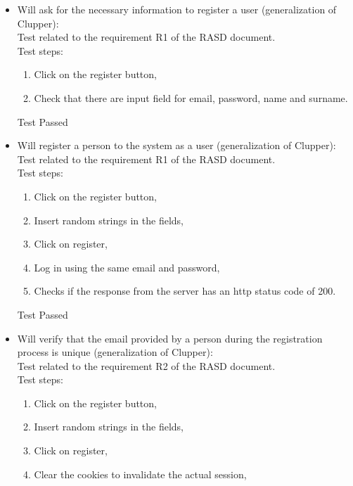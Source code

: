 \begin{itemize}
    \item Will ask for the necessary information to register a user (generalization of Clupper): \\
    Test related to the requirement R1 of the RASD document. \\
    Test steps:
    \begin{enumerate}
        \item Click on the register button,
        \item Check that there are input field for email, password, name and surname.
    \end{enumerate}
    Test Passed \\

    \item Will register a person to the system as a user (generalization of Clupper): \\
    Test related to the requirement R1 of the RASD document. \\
    Test steps:
    \begin{enumerate}
        \item Click on the register button,
        \item Insert random strings in the fields,
        \item Click on register,
        \item Log in using the same email and password,
        \item Checks if the response from the server has an http status code of 200.
    \end{enumerate}
    Test Passed \\

    \item Will verify that the email provided by a person during the registration process is unique (generalization of Clupper):\\
    Test related to the requirement R2 of the RASD document. \\
    Test steps:
    \begin{enumerate}

        \item Click on the register button,

        \item Insert random strings in the fields,

        \item Click on register,

        \item Clear the cookies to invalidate the actual session,


\end{enumerate}
\end{itemize}
